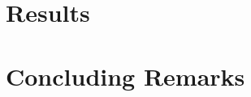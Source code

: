 \documentclass[sigconf,table]{acmart}
\begin{document}
\section{Results}
\label{sec:results}
%

%
%
%


    

\section{Concluding Remarks}
\label{sec:concl}







\end{document}
